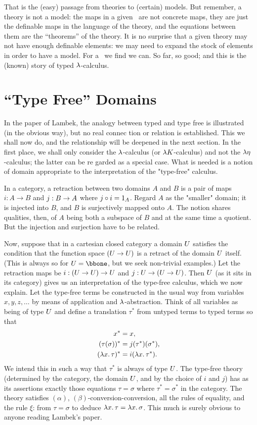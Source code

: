 That is the (easy) passage from theories to (certain) models.
But remember, a theory is not a model: the maps in a given
\ccc\ are not concrete maps, they are just the definable maps in the language of the theory, and the equations between them are the ``theorems'' of the theory. It is no surprise that a given theory may not have enough definable elements: we may need to expand the stock of elements in order to have a model. For a \ccc\ we find we can. So far, so good; and this is the (known) story of typed $\lambda$-calculus.

\section{``Type Free'' Domains}

In the paper of Lambek, the analogy between typed and type free is illustrated (in the obvious way), but no real connec tion or relation is established. This we shall now do, and the relationship will be deepened in the next section.
In the first place, we shall only consider the $\lambda$-calculus (or $\lambda K$-calculus) and not the $\lambda \eta$-calculus; the latter can be re garded as a special case. What is needed is a notion of domain appropriate to the interpretation of the "type-free" calculus.

In a category, a retraction between two domains $A$ and $B$ is a pair of maps $i: A	\to B$ and $j : B \rightarrow A$ where $j \circ i = {\textrm 1}_A$. Regard $A$ as the "smaller" domain; it is injected into $B$, and $B$ is surjectively mapped onto $A$. The notion shares qualities, then, of $A$ being both a subspace of $B$ and at the same time a quotient.
But the injection and surjection have to be related.

Now, suppose that in a cartesian closed category a domain $U$ satisfies the condition that the function space $(U\rightarrow U)$ is a retract of the domain $U$ itself. (This is always so for $\U = \bbone$, but we seek non-trivial examples.) Let the retraction maps be $i: (U \rightarrow U) \rightarrow U$ and $j : U \rightarrow (U \rightarrow U)$. Then $U$ (as it sits in its category) gives us an interpretation of the type-free calculus, which we now explain.
Let the type-free terms be constructed in the usual way from variables $x,y,z, \dots$ by means of application and $\lambda$-abstraction.
Think of all variables as being of type $U$ and define a translation $\tau^*$ from untyped terms to typed terms so that
\begin{align*}
x^* &= x, \\
(\tau(\sigma))^* &= j(\tau^*)(\sigma^*),\\
(\lm{x}.\tau)^* &= i(\lm{x}.\tau^*).
\end{align*}
We intend this in such a way that $\tau^*$ is always of type $U$. The type-free theory (determined by the category, the domain $U$, and by the choice of $i$ and $j$) has as its assertions exactly those equations $\tau = \sigma$ where $\tau^* = \sigma^*$ in the category. The theory satisfies $(\alpha)$, $(\beta)$-conversion-conversion, all the rules of equality, and the rule $\xi$: from $\tau = \sigma$ to deduce $\lambda x .\, \tau = \lambda x .\, \sigma$. This much is surely obvious to anyone reading Lambek's paper.

